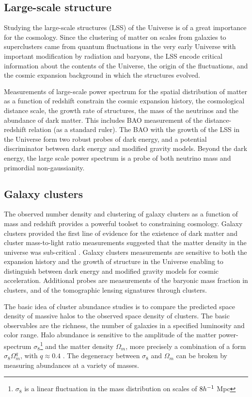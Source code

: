\subsection{Large-scale structure}
Studying the large-scale structures (LSS) of the Universe is of a great importance for the cosmology. Since the clustering of matter on scales from galaxies to superclusters came from quantum fluctuations in the very early Universe with important modification by radiation and baryons, the LSS encode critical information about the contents of the Universe, the origin of the fluctuations, and the cosmic expansion background in which the structures evolved.

Measurements of large-scale power spectrum for the spatial distribution of matter as a function of redshift constrain the cosmic expansion history, the cosmological distance scale, the growth rate of structures, the mass of the neutrinos and the abundance of dark matter. This includes BAO measurement of the distance-redshift relation (as a standard ruler). The BAO with the growth of the LSS in the Universe form two robust probes of dark energy, and a potential discriminator between dark energy and modified gravity models. Beyond the dark energy, the large scale power spectrum is a probe of both neutrino mass and primordial non-gaussianity.
\subsection{Galaxy clusters}
The observed number density and clustering of galaxy clusters as a function of mass and redshift provides a powerful toolset to constraining cosmology.  Galaxy clusters provided the first line of evidence for the existence of dark matter \textcite{zwicky} and cluster mass-to-light ratio measurements suggested that the matter density in the universe was sub-critical \textcite{Gott}. Galaxy clusters measurements are sensitive to both the expansion history and the growth of structure in the Universe enabling to distinguish between dark energy and modified gravity models for cosmic acceleration. Additional probes are measurements of the baryonic mass fraction in clusters, and of the tomographic lensing signatures through clusters.

The basic idea of cluster abundance studies is to compare the predicted space density of massive halos to the observed space density of clusters. The basic observables are the richness, the number of galaxies in a specified luminosity and color range. Halo abundance is sensitive to the amplitude of the matter power-spectrum $\sigma_8$\footnote{$\sigma_8$ is a linear fluctuation in the mass distribution on scales of $8h^{-1}$ Mpc} and the matter density $\Omega_m$, more precisely a combination of a form $\sigma_8\Omega_m^q$, with $q\approx0.4$ \textcite{white}. The degeneracy between $\sigma_8$ and $\Omega_m$ can be broken by measuring abundances at a variety of masses.
